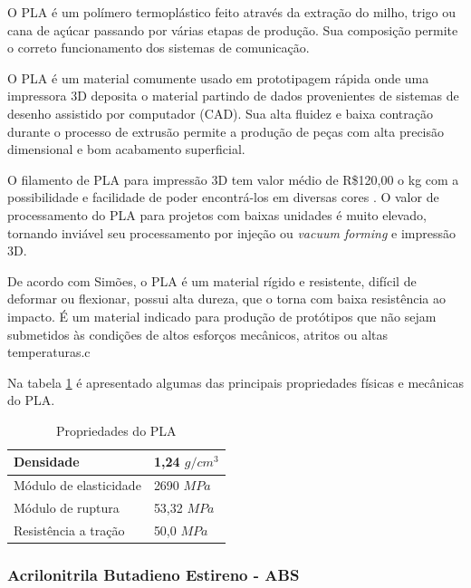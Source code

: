     \par O PLA é um polímero termoplástico feito através da extração do milho, trigo ou cana de açúcar passando por várias etapas de produção. Sua composição permite o correto funcionamento dos sistemas de comunicação. 
    
	\par O PLA é um material comumente usado em prototipagem rápida onde uma impressora 3D deposita o material partindo de dados provenientes de sistemas de desenho assistido por computador (CAD). Sua alta ﬂuidez e baixa contração durante o processo de extrusão permite a produção de peças com alta precisão dimensional e bom acabamento superﬁcial.
	
	\par O filamento de PLA para impressão 3D tem valor médio de R\$120,00 o kg com a possibilidade e facilidade de poder encontrá-los em diversas cores \cite{pla}. O valor de processamento do PLA para projetos com baixas unidades é muito elevado, tornando inviável seu processamento por injeção ou \textit{vacuum forming} e impressão 3D.  
	
	\par De acordo com Simões, o PLA é um material rígido e resistente, difícil de deformar ou ﬂexionar, possui alta dureza, que o torna com baixa resistência ao impacto. É um material indicado para produção de protótipos que não sejam submetidos às condições de altos esforços mecânicos, atritos ou altas temperaturas.c\cite{simoes2009mechanical}
	
	\par Na tabela \ref{tab:PLA} é apresentado algumas das principais propriedades físicas e mecânicas do PLA. \cite{santana2018comparative}

    \begin{table}[h]
\centering
\begin{tabular}{|l|l|}
\hline
Densidade              & 1,24 $g/cm^3$ \\ \hline
Módulo de elasticidade & 2690 $MPa$ \\ \hline
Módulo de ruptura      & 53,32 $MPa$ \\ \hline
Resistência a tração   & 50,0 $MPa$ \\ \hline
\end{tabular}
\caption{Propriedades do PLA}
\label{tab:PLA}
\end{table}

\subsubsection{Acrilonitrila Butadieno Estireno - ABS}
    
